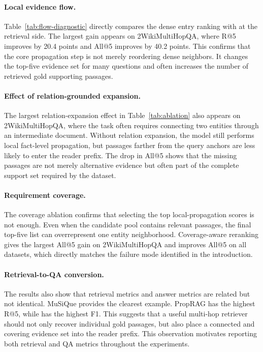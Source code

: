 \paragraph{Local evidence flow.}
Table~\ref{tab:flow-diagnostic} directly compares the dense entry
ranking with \methodname{} at the retrieval side. The largest gain
appears on 2WikiMultiHopQA, where R@5 improves by 20.4 points and All@5
improves by 40.2 points. This confirms that the core propagation step is
not merely reordering dense neighbors. It changes the top-five evidence
set for many questions and often increases the number of retrieved gold
supporting passages.

\paragraph{Effect of relation-grounded expansion.}
The largest relation-expansion effect in Table~\ref{tab:ablation} also
appears on 2WikiMultiHopQA, where the task often requires connecting two
entities through an intermediate document. Without relation expansion,
the model still performs local fact-level propagation, but passages
farther from the query anchors are less likely to enter the reader
prefix. The drop in All@5 shows that the missing passages are not merely
alternative evidence but often part of the complete support set required
by the dataset.

\paragraph{Requirement coverage.}
The coverage ablation confirms that selecting the top local-propagation
scores is not enough. Even when the candidate pool contains relevant
passages, the final top-five list can overrepresent one entity
neighborhood. Coverage-aware reranking gives the largest All@5 gain on
2WikiMultiHopQA and improves All@5 on all datasets, which directly
matches the failure mode identified in the introduction.

\paragraph{Retrieval-to-QA conversion.}
The results also show that retrieval metrics and answer metrics are
related but not identical. MuSiQue provides the clearest example.
PropRAG has the highest R@5, while \methodname{} has the highest F1.
This suggests that a useful multi-hop retriever should not only recover
individual gold passages, but also place a connected and covering
evidence set into the reader prefix. This observation motivates reporting
both retrieval and QA metrics throughout the experiments.
